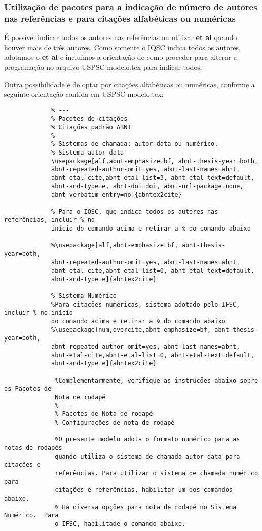 \subsubsection{Utilização de pacotes para a indicação de número de autores nas referências e para citações alfabéticas ou numéricas}
É possível indicar todos os autores nas referências ou utilizar \textbf{et al} quando houver mais de três autores. Como somente o IQSC indica todos os autores, adotamos o \textbf{et al} e incluímos a orientação de como proceder para alterar a programação no arquivo USPSC-modelo.tex para indicar todos.

Outra possibilidade é de optar por citações alfabéticas ou numéricas, conforme a seguinte orientação contida em USPSC-modelo.tex:	
		  
			 \begin{verbatim}
			 % ---
			 % Pacotes de citações
			 % Citações padrão ABNT
			 % ---
			 % Sistemas de chamada: autor-data ou numérico.
			 % Sistema autor-data
			 \usepackage[alf,abnt-emphasize=bf, abnt-thesis-year=both,
			 abnt-repeated-author-omit=yes, abnt-last-names=abnt,
			 abnt-etal-cite,abnt-etal-list=3, abnt-etal-text=default, 
			 abnt-and-type=e, abnt-doi=doi, abnt-url-package=none,
			 abnt-verbatim-entry=no]{abntex2cite}
			 
			 % Para o IQSC, que indica todos os autores nas referências, incluir % no 
			 início do comando acima e retirar a % do comando abaixo 
			 
			 %\usepackage[alf,abnt-emphasize=bf, abnt-thesis-year=both,
			 abnt-repeated-author-omit=yes, abnt-last-names=abnt,
			 abnt-etal-cite,abnt-etal-list=0, abnt-etal-text=default,
			 abnt-and-type=e]{abntex2cite}
			 
			 % Sistema Numérico
			 %Para citações numéricas, sistema adotado pelo IFSC, incluir % no início 
			 do comando acima e retirar a % do comando abaixo 
			 %\usepackage[num,overcite,abnt-emphasize=bf, abnt-thesis-year=both,
			 abnt-repeated-author-omit=yes, abnt-last-names=abnt,
			 abnt-etal-cite,abnt-etal-list=0, abnt-etal-text=default,
			 abnt-and-type=e]{abntex2cite}
			  
			  %Complementarmente, verifique as instruções abaixo sobre os Pacotes de 
			  Nota de rodapé
			  % ---
			  % Pacotes de Nota de rodapé
			  % Configurações de nota de rodapé
			  
			  %O presente modelo adota o formato numérico para as notas de rodapés 
			  quando utiliza o sistema de chamada autor-data para citações e 
			  referências. Para utilizar o sistema de chamada numérico para 
			  citações e referências, habilitar um dos comandos abaixo.
			  % Há diversa opções para nota de rodapé no Sistema Numérico.  Para
			  o IFSC, habilitade o comando abaixo.
			  

\end{verbatim}
